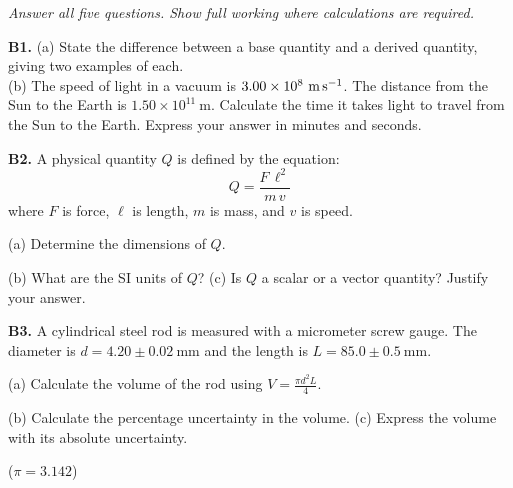\begin{exercisebox}[1]
\textit{Answer all five questions. Show full working
where calculations are required.}

\vspace{0.3cm}

\textbf{B1.} (a) State the difference between a base
quantity and a derived quantity, giving two examples
of each.\\
(b) The speed of light in a vacuum is
$3.00 \times 10^8\ \text{m\,s}^{-1}$. The distance
from the Sun to the Earth is
$1.50 \times 10^{11}\ \text{m}$.
Calculate the time it takes light to travel from the
Sun to the Earth. Express your answer in minutes and
seconds.
\hfill{}

\vspace{0.4cm}

\textbf{B2.} A physical quantity $Q$ is defined by the
equation:
\[
  Q = \frac{F\,\ell^2}{m\,v}
\]
where $F$ is force, $\ell$ is length, $m$ is mass, and
$v$ is speed.

\smallskip

(a) Determine the dimensions of $Q$.

(b) What are the SI units of $Q$?
(c) Is $Q$ a scalar or a vector quantity? Justify your
answer.
\hfill{}

\vspace{0.4cm}

\textbf{B3.} A cylindrical steel rod is measured with
a micrometer screw gauge. The diameter is
$d = 4.20 \pm 0.02\ \text{mm}$ and the length is
$L = 85.0 \pm 0.5\ \text{mm}$.

\begin{center}
\end{center}

\smallskip

(a) Calculate the volume of the rod using
$V = \frac{\pi d^2 L}{4}$.

(b) Calculate the percentage uncertainty in the volume.
(c) Express the volume with its absolute uncertainty.

($\pi = 3.142$)
\hfill{}


\end{exercisebox}
